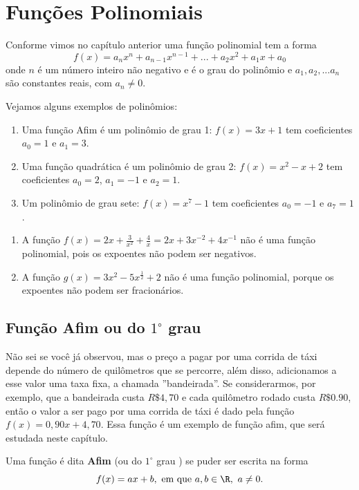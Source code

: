 \chapter{Funções Polinomiais}

Conforme vimos no capítulo anterior uma função polinomial tem a forma
$$f(x)=a_nx^n+ a_{n-1}x^{n-1}+...+ a_2x^2+a_1x+a_0$$
onde $n$ é um número inteiro não negativo e é o grau do polinômio e $a_1,a_2,...a_n$ são constantes reais, com $a_n \neq 0$.
\begin{exe}
	Vejamos alguns exemplos de polinômios:
	\begin{enumerate}
		\item Uma função Afim é um polinômio de grau 1:
		$f(x)=3x+1$ tem coeficientes $a_0=1$ e $a_1=3$.
		\item Uma função quadrática é um polinômio de grau 2:
		$f(x)=x^2-x+2$ tem coeficientes $a_0=2$, $a_1=-1$ e $a_2=1$.
		\item Um polinômio de grau sete:
		$f(x)=x^7-1$ tem coeficientes $a_0=-1$ e $a_7=1$.
	\end{enumerate}
\end{exe}


\begin{obs}
	\begin{enumerate}
		\item A função $f(x)=2x+\frac{3}{x^2}+\frac{4}{x}=2x+3x^{-2}+4x^{-1}$ não é uma função polinomial, pois os expoentes não podem ser negativos.
		\item A função $g(x)=3x^2-5x^{\frac{1}{2}}+2$ não é uma função polinomial, porque os expoentes não podem ser fracionários.
	\end{enumerate}
\end{obs}
\section{Função Afim ou do $1^{\circ}$ grau}

Não sei se você já observou, mas o preço a pagar por uma corrida de táxi depende do número de quilômetros que se percorre, além disso, adicionamos a esse valor uma taxa fixa, a chamada ''bandeirada''. Se considerarmos, por exemplo, que a bandeirada custa $ R\$4,70$ e cada quilômetro rodado custa $ R\$0.90$, então o valor a ser pago por uma corrida de táxi é dado pela função $f(x)=0,90x+4,70$. Essa função é um exemplo de função afim, que será estudada neste capítulo.

Uma função é dita \textbf{Afim} (ou do $1^{\circ}$ grau ) se puder ser escrita na forma
\begin{equation}\label{eqretageral}f(x)=ax+b, \text{ em que }a,b\in\R,~a\neq 0.\end{equation}

